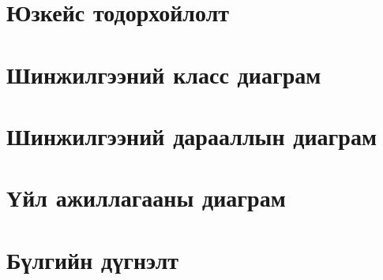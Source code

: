 \section{Юзкейс тодорхойлолт}

\section{Шинжилгээний класс диаграм}

\section{Шинжилгээний дарааллын диаграм}

\section{Үйл ажиллагааны диаграм}

\section{Бүлгийн дүгнэлт}